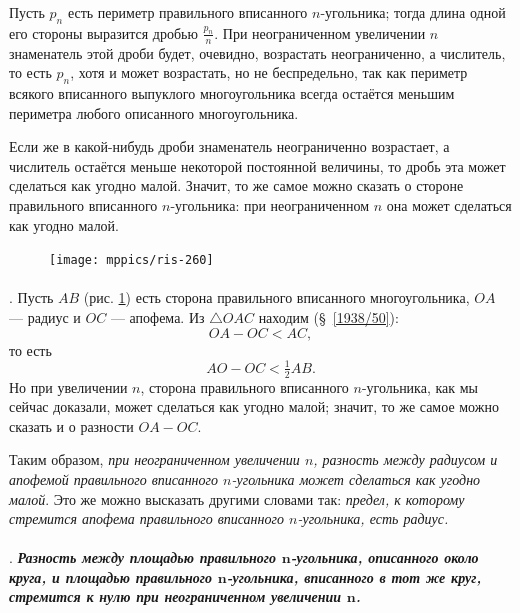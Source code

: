 \documentclass[twoside]{book}
\begin{document}
Пусть $p_n$ есть периметр правильного вписанного $n$-угольника;
тогда длина одной его стороны выразится дробью $\frac {p_n}n$.
При неограниченном увеличении $n$ знаменатель этой дроби будет, очевидно, возрастать неограниченно, а числитель, то есть $p_n$, хотя и может возрастать, но не беспредельно,
так как периметр всякого вписанного выпуклого многоугольника всегда остаётся меньшим периметра любого описанного многоугольника.

Если же в какой-нибудь дроби знаменатель неограниченно возрастает, а числитель остаётся меньше некоторой постоянной величины, то дробь эта может сделаться как угодно малой.
Значит, то же самое можно сказать о стороне правильного вписанного $n$-угольника:
при неограниченном $n$ она может сделаться как угодно малой.

\begin{figure}
\vskip-8mm
\centering
\texttt{[image: mppics/ris-260]}
\caption{}\label{1938/ris-260}
\end{figure}

\paragraph{}\label{1938/263}
\mbox{.}
Пусть $AB$ (рис. \ref{1938/ris-260}) есть сторона правильного вписанного многоугольника, $OA$ — радиус и $OC$ — апофема.
Из $\triangle OAC$ находим (§~\ref{1938/50}):
\[OA-OC<AC,\]
то есть
\[AO-OC<\tfrac12 AB.\]
Но при увеличении $n$, сторона правильного вписанного $n$-угольника, как мы сейчас доказали, может сделаться как угодно малой;
значит, то же самое можно сказать и о разности $OA-OC$.

{\sloppy

Таким образом, \emph{при неограниченном увеличении $n$, разность между радиусом и апофемой правильного вписанного $n$-угольника может сделаться как угодно малой}.
Это же можно высказать другими словами так: \emph{предел, к которому стремится апофема правильного вписанного $n$-угольника, есть радиус.}

}

\paragraph{}\label{1914/230}
.
\textbf{\emph{Разность между площадью правильного $\bm{n}$-угольника, описанного около круга, и площадью правильного $\bm{n}$-угольника, вписанного в тот же
круг, стремится к нулю при неограниченном увеличении $\bm{n}$.}}
\end{document}
